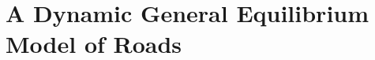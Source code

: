 \clearpage













\section{A Dynamic General Equilibrium Model of Roads} \label{sec:appxdmodel}


